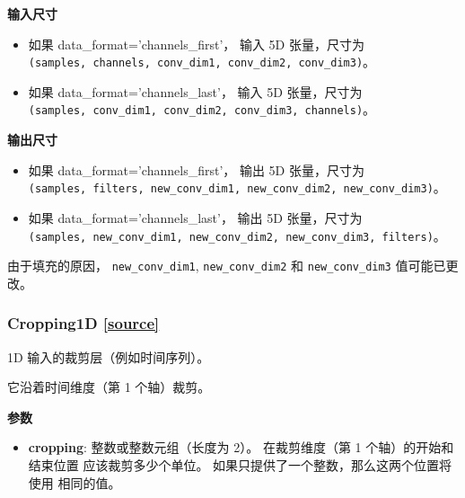 \textbf{输入尺寸}

\begin{itemize}
\tightlist
\item
  如果 data\_format='channels\_first'， 输入 5D 张量，尺寸为
  \texttt{(samples,\ channels,\ conv\_dim1,\ conv\_dim2,\ conv\_dim3)}。
\item
  如果 data\_format='channels\_last'， 输入 5D 张量，尺寸为
  \texttt{(samples,\ conv\_dim1,\ conv\_dim2,\ conv\_dim3,\ channels)}。
\end{itemize}

\textbf{输出尺寸}

\begin{itemize}
\tightlist
\item
  如果 data\_format='channels\_first'， 输出 5D 张量，尺寸为
  \texttt{(samples,\ filters,\ new\_conv\_dim1,\ new\_conv\_dim2,\ new\_conv\_dim3)}。
\item
  如果 data\_format='channels\_last'， 输出 5D 张量，尺寸为
  \texttt{(samples,\ new\_conv\_dim1,\ new\_conv\_dim2,\ new\_conv\_dim3,\ filters)}。
\end{itemize}

由于填充的原因， \texttt{new\_conv\_dim1}, \texttt{new\_conv\_dim2} 和
\texttt{new\_conv\_dim3} 值可能已更改。



\subsubsection{Cropping1D {\href{https://github.com/keras-team/keras/blob/master/keras/layers/convolutional.py\#L1962}{{[}source{]}}}}

\begin{Shaded}
\begin{Highlighting}[]
\OperatorTok{=}\NormalTok{(}\NormalTok{, }\NormalTok{))}
\end{Highlighting}
\end{Shaded}

1D 输入的裁剪层（例如时间序列）。

它沿着时间维度（第 1 个轴）裁剪。

\textbf{参数}

\begin{itemize}
\tightlist
\item
  \textbf{cropping}: 整数或整数元组（长度为 2）。 在裁剪维度（第 1
  个轴）的开始和结束位置 应该裁剪多少个单位。
  如果只提供了一个整数，那么这两个位置将使用 相同的值。
\end{itemize}

